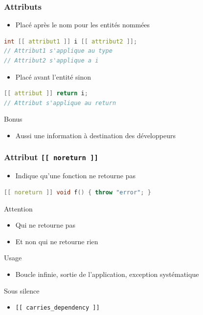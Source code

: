 \documentclass[C++.tex]{subfiles}
\begin{document}
\begin{frame}[fragile]
	\frametitle{Attributs}
	\begin{itemize}
		\item Placé après le nom pour les entités nommées
	\end{itemize}

	\begin{lstlisting}[language=C++]
int [[ attribut1 ]] i [[ attribut2 ]];
// Attribut1 s'applique au type
// Attribut2 s'applique a i\end{lstlisting}

	\begin{itemize}
		\item Placé avant l'entité sinon
	\end{itemize}

	\begin{lstlisting}[language=C++]
[[ attribut ]] return i;
// Attribut s'applique au return\end{lstlisting}

	\begin{exampleblock}{Bonus}
		\begin{itemize}
			\item Aussi une information à destination des développeurs
		\end{itemize}
	\end{exampleblock}
\end{frame}

\begin{frame}[fragile]
	\frametitle{Attribut \lstinline|[[ noreturn ]]|}
	\begin{itemize}
		\item Indique qu'une fonction ne retourne pas
	\end{itemize}

	\begin{lstlisting}[language=C++]
[[ noreturn ]] void f() { throw "error"; }\end{lstlisting}

	\begin{alertblock}{Attention}
		\begin{itemize}
			\item Qui ne retourne pas
			\item Et non qui ne retourne rien
		\end{itemize}
	\end{alertblock}

	\begin{block}{Usage}
		\begin{itemize}
			\item Boucle infinie, sortie de l'application, exception systématique
		\end{itemize}
	\end{block}

	\begin{block}{Sous silence}
		\begin{itemize}
			\item \lstinline|[[ carries_dependency ]]|
		\end{itemize}
	\end{block}
\end{frame}
\end{document}
